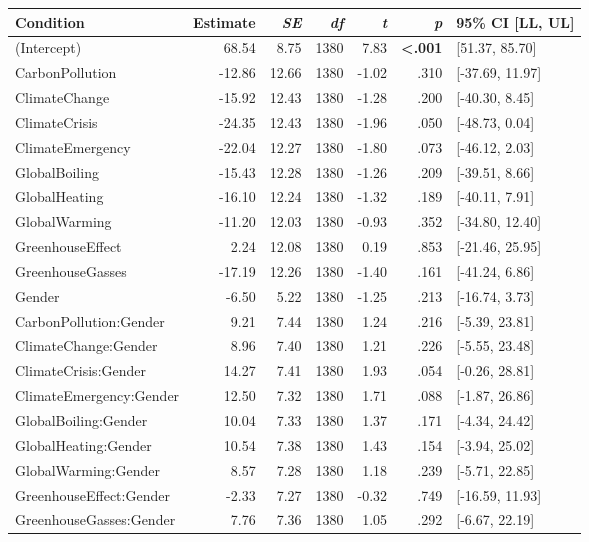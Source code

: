 \begin{table}[ht]
\centering
\begin{tabular}{lrrrrrl}
  \hline
Condition & Estimate & \textit{SE} & \textit{df} & \textit{t} & \textit{p} & 95\% CI [LL, UL] \\ 
  \hline
(Intercept) & 68.54 & 8.75 & 1380 & 7.83 & \textbf{\textless  .001} & [51.37, 85.70] \\ 
  CarbonPollution & -12.86 & 12.66 & 1380 & -1.02 & .310 & [-37.69, 11.97] \\ 
  ClimateChange & -15.92 & 12.43 & 1380 & -1.28 & .200 & [-40.30, 8.45] \\ 
  ClimateCrisis & -24.35 & 12.43 & 1380 & -1.96 & .050 & [-48.73, 0.04] \\ 
  ClimateEmergency & -22.04 & 12.27 & 1380 & -1.80 & .073 & [-46.12, 2.03] \\ 
  GlobalBoiling & -15.43 & 12.28 & 1380 & -1.26 & .209 & [-39.51, 8.66] \\ 
  GlobalHeating & -16.10 & 12.24 & 1380 & -1.32 & .189 & [-40.11, 7.91] \\ 
  GlobalWarming & -11.20 & 12.03 & 1380 & -0.93 & .352 & [-34.80, 12.40] \\ 
  GreenhouseEffect & 2.24 & 12.08 & 1380 & 0.19 & .853 & [-21.46, 25.95] \\ 
  GreenhouseGasses & -17.19 & 12.26 & 1380 & -1.40 & .161 & [-41.24, 6.86] \\ 
  Gender & -6.50 & 5.22 & 1380 & -1.25 & .213 & [-16.74, 3.73] \\ 
  CarbonPollution:Gender & 9.21 & 7.44 & 1380 & 1.24 & .216 & [-5.39, 23.81] \\ 
  ClimateChange:Gender & 8.96 & 7.40 & 1380 & 1.21 & .226 & [-5.55, 23.48] \\ 
  ClimateCrisis:Gender & 14.27 & 7.41 & 1380 & 1.93 & .054 & [-0.26, 28.81] \\ 
  ClimateEmergency:Gender & 12.50 & 7.32 & 1380 & 1.71 & .088 & [-1.87, 26.86] \\ 
  GlobalBoiling:Gender & 10.04 & 7.33 & 1380 & 1.37 & .171 & [-4.34, 24.42] \\ 
  GlobalHeating:Gender & 10.54 & 7.38 & 1380 & 1.43 & .154 & [-3.94, 25.02] \\ 
  GlobalWarming:Gender & 8.57 & 7.28 & 1380 & 1.18 & .239 & [-5.71, 22.85] \\ 
  GreenhouseEffect:Gender & -2.33 & 7.27 & 1380 & -0.32 & .749 & [-16.59, 11.93] \\ 
  GreenhouseGasses:Gender & 7.76 & 7.36 & 1380 & 1.05 & .292 & [-6.67, 22.19] \\ 
   \hline
\end{tabular}
\end{table}
